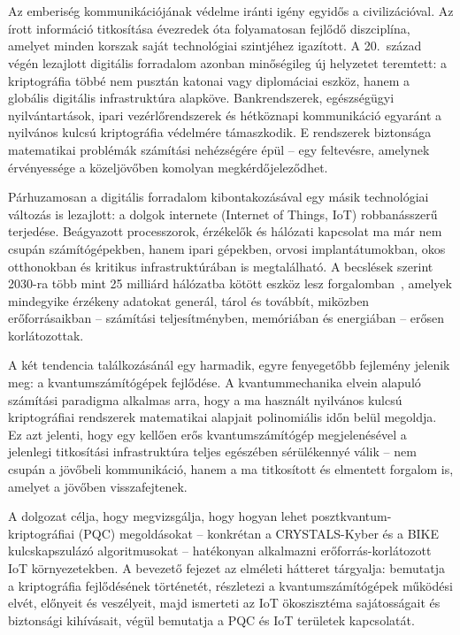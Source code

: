 \chapter{\bevezetes}

Az emberiség kommunikációjának védelme iránti igény egyidős a civilizációval. Az írott információ
titkosítása évezredek óta folyamatosan fejlődő diszciplína, amelyet minden korszak saját technológiai
szintjéhez igazított. A 20.\ század végén lezajlott digitális forradalom azonban minőségileg új
helyzetet teremtett: a kriptográfia többé nem pusztán katonai vagy diplomáciai eszköz, hanem a
globális digitális infrastruktúra alapköve. Bankrendszerek, egészségügyi nyilvántartások, ipari
vezérlőrendszerek és hétköznapi kommunikáció egyaránt a nyilvános kulcsú kriptográfia védelmére
támaszkodik. E rendszerek biztonsága matematikai problémák számítási nehézségére épül -- egy
feltevésre, amelynek érvényessége a közeljövőben komolyan megkérdőjeleződhet.

Párhuzamosan a digitális forradalom kibontakozásával egy másik technológiai változás is lezajlott:
a dolgok internete (Internet of Things, IoT) robbanásszerű terjedése. Beágyazott processzorok,
érzékelők és hálózati kapcsolat ma már nem csupán számítógépekben, hanem ipari gépekben, orvosi
implantátumokban, okos otthonokban és kritikus infrastruktúrában is megtalálható. A becslések
szerint 2030-ra több mint 25 milliárd hálózatba kötött eszköz lesz forgalomban~\cite{iot_forecast_2023},
amelyek mindegyike érzékeny adatokat generál, tárol és továbbít, miközben erőforrásaikban --
számítási teljesítményben, memóriában és energiában -- erősen korlátozottak.

A két tendencia találkozásánál egy harmadik, egyre fenyegetőbb fejlemény jelenik meg: a
kvantumszámítógépek fejlődése. A kvantummechanika elvein alapuló számítási paradigma alkalmas arra,
hogy a ma használt nyilvános kulcsú kriptográfiai rendszerek matematikai alapjait polinomiális időn
belül megoldja. Ez azt jelenti, hogy egy kellően erős kvantumszámítógép megjelenésével a jelenlegi
titkosítási infrastruktúra teljes egészében sérülékennyé válik -- nem csupán a jövőbeli
kommunikáció, hanem a ma titkosított és elmentett forgalom is, amelyet a jövőben visszafejtenek.

A dolgozat célja, hogy megvizsgálja, hogy hogyan lehet posztkvantum-kriptográfiai (PQC) megoldásokat --
konkrétan a CRYSTALS-Kyber és a BIKE kulcskapszulázó algoritmusokat -- hatékonyan alkalmazni
erőforrás-korlátozott IoT környezetekben. A bevezető fejezet az elméleti hátteret tárgyalja:
bemutatja a kriptográfia fejlődésének történetét, részletezi a kvantumszámítógépek működési elvét,
előnyeit és veszélyeit, majd ismerteti az IoT ökoszisztéma sajátosságait és biztonsági kihívásait,
végül bemutatja a PQC és IoT területek kapcsolatát.


